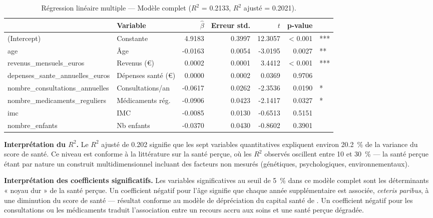 \documentclass[11pt,a4paper]{memoirerecherche}
\begin{document}
\begin{table}[!h]
\centering
\caption{\label{tab:tab-reg-complet}Régression linéaire multiple --- Modèle complet ($R^2$ = 0.2133, $R^2$ ajusté = 0.2021).}
\centering
\fontsize{8}{10}\selectfont
\begin{tabular}[t]{llrrrrl}
\toprule
  & Variable & $\hat{\beta}$ & Erreur std. & $t$ & p-value & \\
\midrule
(Intercept) & Constante & 4.9183 & 0.3997 & 12.3057 & < 0.001 & ***\\
age & Âge & -0.0163 & 0.0054 & -3.0195 & 0.0027 & **\\
revenus_mensuels_euros & Revenus (€) & 0.0002 & 0.0001 & 3.4412 & < 0.001 & ***\\
depenses_sante_annuelles_euros & Dépenses santé (€) & 0.0000 & 0.0002 & 0.0369 & 0.9706 & \\
nombre_consultations_annuelles & Consultations/an & -0.0617 & 0.0262 & -2.3536 & 0.0190 & *\\
\addlinespace
nombre_medicaments_reguliers & Médicaments rég. & -0.0906 & 0.0423 & -2.1417 & 0.0327 & *\\
imc & IMC & -0.0085 & 0.0130 & -0.6513 & 0.5151 & \\
nombre_enfants & Nb enfants & -0.0370 & 0.0430 & -0.8602 & 0.3901 & \\
\bottomrule
\end{tabular}
\end{table}

\textbf{Interprétation du \(R^2\).} Le \(R^2\) ajusté de 0.202 signifie que les sept variables quantitatives expliquent environ 20.2~\% de la variance du score de santé. Ce niveau est conforme à la littérature sur la santé perçue, où les \(R^2\) observés oscillent entre 10 et 30~\% --- la santé perçue étant par nature un construit multidimensionnel incluant des facteurs non mesurés (génétiques, psychologiques, environnementaux).

\textbf{Interprétation des coefficients significatifs.} Les variables significatives au seuil de 5~\% dans ce modèle complet sont les déterminants « noyau dur » de la santé perçue. Un coefficient négatif pour l'âge signifie que chaque année supplémentaire est associée, \emph{ceteris paribus}, à une diminution du score de santé --- résultat conforme au modèle de dépréciation du capital santé de \textcite{grossman1972}. Un coefficient négatif pour les consultations ou les médicaments traduit l'association entre un recours accru aux soins et une santé perçue dégradée.
\end{document}
